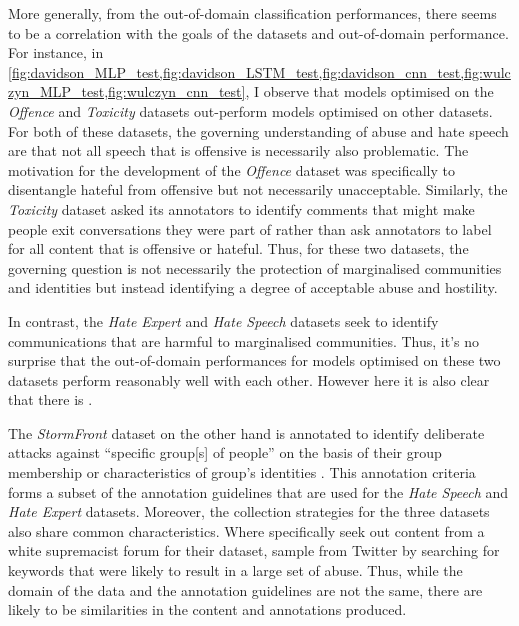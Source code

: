 More generally, from the out-of-domain classification performances, there seems to be a correlation with the goals of the datasets and out-of-domain performance.
For instance, in \cref{fig:davidson_MLP_test,fig:davidson_LSTM_test,fig:davidson_cnn_test,fig:wulczyn_MLP_test,fig:wulczyn_cnn_test}, I observe that models optimised on the \textit{Offence} and \textit{Toxicity} datasets out-perform models optimised on other datasets.
For both of these datasets, the governing understanding of abuse and hate speech are that not all speech that is offensive is necessarily also problematic.
The motivation for the development of the \textit{Offence} dataset was specifically to disentangle hateful from offensive but not necessarily unacceptable.
Similarly, the \textit{Toxicity} dataset asked its annotators to identify comments that might make people exit conversations they were part of rather than ask annotators to label for all content that is offensive or hateful.
Thus, for these two datasets, the governing question is not necessarily the protection of marginalised communities and identities but instead identifying a degree of acceptable abuse and hostility.

In contrast, the \textit{Hate Expert} and \textit{Hate Speech} datasets seek to identify communications that are harmful to marginalised communities.
Thus, it's no surprise that the out-of-domain performances for models optimised on these two datasets perform reasonably well with each other.
However here it is also clear that there is .

The \textit{StormFront} dataset on the other hand is annotated to identify deliberate attacks against ``specific group[s] of people'' on the basis of their group membership or characteristics of group's identities \citep{Garcia:2019}.
This annotation criteria forms a subset of the annotation guidelines that are used for the \textit{Hate Speech} and \textit{Hate Expert} datasets.
Moreover, the collection strategies for the three datasets also share common characteristics.
Where \citet{Garcia:2019} specifically seek out content from a white supremacist forum for their dataset, \citet{Waseem:2016,Waseem-Hovy:2016} sample from Twitter by searching for keywords that were likely to result in a large set of  abuse.
Thus, while the domain of the data and the annotation guidelines are not the same, there are likely to be similarities in the content and annotations produced.

